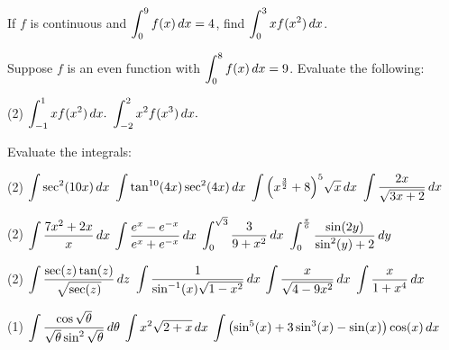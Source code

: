 \documentclass[mathNotesPreamble]{subfiles}
\begin{document}
  \begin{ex*}
    If $f$ is continuous and $\ds\int_0^9 f(x)\,dx=4$, find $\ds\int_0^3 xf(x^2)\,dx$.
  \end{ex*}
  
  \begin{ex*}
    Suppose $f$ is an even function with $\ds\int_0^8 f(x)\,dx=9$. Evaluate the following:
  \end{ex*}
  \begin{tasks}(2)
    \task $\ds\int_{-1}^1 x f(x^2)\,dx.$
    \task $\ds\int_{-2}^2 x^2 f(x^3)\,dx.$
  \end{tasks}
  \pagebreak
  
  \begin{ex*}
    Evaluate the integrals:
  \end{ex*}
  \begin{tasks}[after-item-skip=\stretch{1}](2)
    \task $\ds\int \sec^2(10x)\,dx$
    \task $\ds\int \tan^{10}(4x)\sec^2(4x)\,dx$
    \task $\ds\int\parens{x^\frac{3}{2}+8}^5\sqrt{x}\,dx$
    \task $\ds\int \frac{2x}{\sqrt{3x+2}}\,dx$
  \end{tasks}
  \pagebreak
  
  \begin{tasks}[after-item-skip=\stretch{1}, resume](2)
    \task $\ds\int \frac{7x^2+2x}{x}\,dx$
    \task $\ds\int \frac{e^x-e\inv[x]}{e^x+e\inv[x]}\,dx$
    \task $\ds\int_0^{\sqrt{3}} \frac{3}{9+x^2}\,dx$
    \task $\ds\int_0^{\frac{\pi}{6}} \frac{\sin(2y)}{\sin^2(y)+2}\,dy$
  \end{tasks}
  \pagebreak
  
  \begin{tasks}[after-item-skip=\stretch{1}, resume](2)
    \task $\ds\int \frac{\sec(z)\tan(z)}{\sqrt{\sec(z)}}\,dz$
    \task $\ds\int \frac{1}{\sin\inv(x)\sqrt{1-x^2}}\,dx$
    \task $\ds\int \frac{x}{\sqrt{4-9x^2}}\,dx$
    \task $\ds\int \frac{x}{1+x^4}\,dx$
  \end{tasks}
  \pagebreak
  
  \begin{tasks}[after-item-skip=\stretch{1}, resume](1)
    \task $\ds\int \frac{\cos\sqrt{\theta}}{\sqrt{\theta}\sin^2\sqrt{\theta}}\,d\theta$
    \task $\ds\int x^2\sqrt{2+x}\,dx$
    \task* $\ds\int \parens{\sin^5(x)+3\sin^3(x)-\sin(x)}\cos(x)\,dx$
  \end{tasks}
  \pagebreak
  
\end{document}

